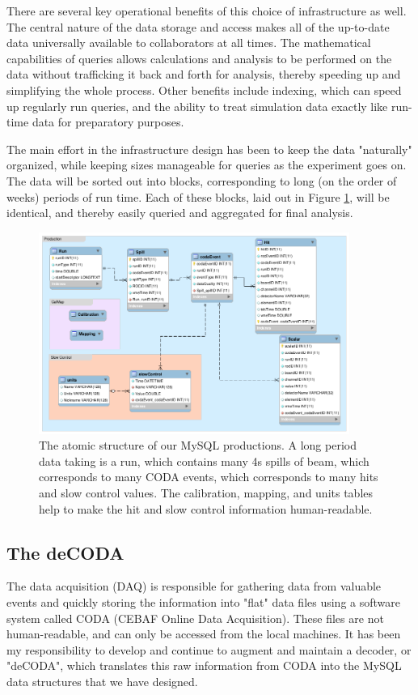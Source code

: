\documentclass[11pt]{article}
\begin{document}
There are several key operational benefits of this choice of infrastructure as well. The central nature of the data storage and access makes all of the up-to-date data universally available to collaborators at all times.  The mathematical capabilities of queries allows calculations and analysis to be performed on the data without trafficking it back and forth for analysis, thereby speeding up and simplifying the whole process. Other benefits include indexing, which can speed up regularly run queries, and the ability to treat simulation data exactly like run-time data for preparatory purposes.

The main effort in the infrastructure design has been to keep the data "naturally" organized, while keeping sizes manageable for queries as the experiment goes on. The data will be sorted out into blocks, corresponding to long (on the order of weeks) periods of run time. Each of these blocks, laid out in Figure \ref{fig:eer}, will be identical, and thereby easily queried and aggregated for final analysis.

 \begin{figure}
  \centerline{
    \mbox{\includegraphics[width=4.00in]{EER.png}}
  }
  \caption{The atomic structure of our MySQL productions. A long period data taking is a run, which contains many 4s spills of beam, which corresponds to many CODA events, which corresponds to many hits and slow control values.  The calibration, mapping, and units tables help to make the hit and slow control information human-readable.}
  \label{fig:eer}
  \end{figure}

\subsection{The deCODA}
The data acquisition (DAQ) is responsible for gathering data from valuable events and quickly storing the information into "flat" data files using a software system called CODA (CEBAF Online Data Acquisition).  These files are not human-readable, and can only be accessed from the local machines.  It has been my responsibility to develop and continue to augment and maintain a decoder, or "deCODA", which translates this raw information from CODA into the MySQL data structures that we have designed.
\end{document}
